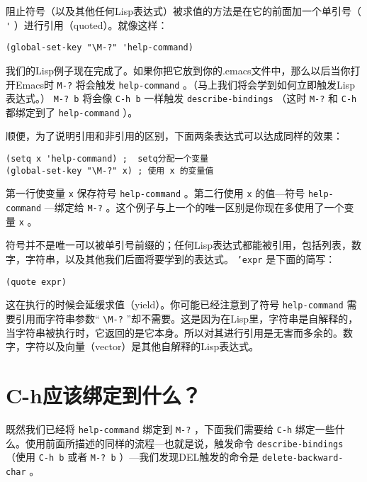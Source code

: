 阻止符号（以及其他任何Lisp表达式）被求值的方法是在它的前面加一个单引号（ \verb|'| ）进行引用（quoted）。就像这样：

\begin{verbatim}
(global-set-key "\M-?" 'help-command)
\end{verbatim}

我们的Lisp例子现在完成了。如果你把它放到你的.emacs文件中，那么以后当你打开Emacs时 \verb|M-?| 将会触发 \texttt{help-command} 。（马上我们将会学到如何立即触发Lisp表达式。） \verb|M-? b| 将会像 \verb|C-h b| 一样触发 \texttt{describe-bindings} （这时 \verb|M-?| 和 \verb|C-h| 都绑定到了 \texttt{help-command} ）。

顺便，为了说明引用和非引用的区别，下面两条表达式可以达成同样的效果：

\begin{verbatim}
(setq x 'help-command) ;  setq分配一个变量
(global-set-key "\M-?" x) ; 使用 x 的变量值
\end{verbatim}

第一行使变量 \texttt{x} 保存符号 \texttt{help-command} 。第二行使用 \texttt{x} 的值---符号 \texttt{help-command} ---绑定给 \verb|M-?| 。这个例子与上一个的唯一区别是你现在多使用了一个变量 \texttt{x} 。

符号并不是唯一可以被单引号前缀的；任何Lisp表达式都能被引用，包括列表，数字，字符串，以及其他我们后面将要学到的表达式。 \texttt{'expr} 是下面的简写：

\begin{verbatim}
(quote expr)
\end{verbatim}

这在执行的时候会延缓求值（yield）。你可能已经注意到了符号 \texttt{help-command} 需要引用而字符串参数“ \verb|\M-?| ”却不需要。这是因为在Lisp里，字符串是自解释的，当字符串被执行时，它返回的是它本身。所以对其进行引用是无害而多余的。数字，字符以及向量（vector）是其他自解释的Lisp表达式。

\section{C-h应该绑定到什么？}
\label{section:01-To-What-Should-C-h-Be-Bound}

既然我们已经将 \texttt{help-command} 绑定到 \verb|M-?| ，下面我们需要给 \verb|C-h| 绑定一些什么。使用前面所描述的同样的流程---也就是说，触发命令 \texttt{describe-bindings} （使用 \verb|C-h b| 或者 \verb|M-? b| ）---我们发现DEL触发的命令是 \texttt{delete-backward-char} 。

